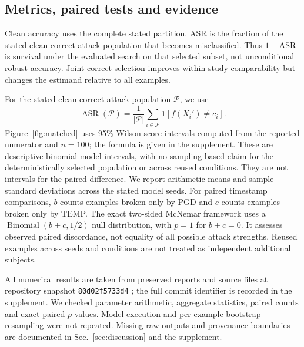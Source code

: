 \subsection{Metrics, paired tests and evidence}
Clean accuracy uses the complete stated partition. ASR is the fraction of the stated clean-correct attack population that becomes misclassified. Thus $1-\mathrm{ASR}$ is survival under the evaluated search on that selected subset, not unconditional robust accuracy. Joint-correct selection improves within-study comparability but changes the estimand relative to all examples.

For the stated clean-correct attack population $\mathcal{P}$, we use
\begin{equation}\label{eq:asr}
\operatorname{ASR}(\mathcal{P})=
\frac{1}{|\mathcal{P}|}\sum_{i\in\mathcal{P}}\mathbf{1}\!\left[f(X_i')\neq c_i\right].
\end{equation}
Figure~\ref{fig:matched} uses 95\% Wilson score intervals \cite{wilson1927} computed from the reported numerator and $n=100$; the formula is given in the supplement. These are descriptive binomial-model intervals, with no sampling-based claim for the deterministically selected population or across reused conditions. They are not intervals for the paired difference. We report arithmetic means and sample standard deviations across the stated model seeds. For paired timestamp comparisons, $b$ counts examples broken only by PGD and $c$ counts examples broken only by TEMP. The exact two-sided McNemar framework \cite{mcnemar1947} uses a $\operatorname{Binomial}(b+c,1/2)$ null distribution, with $p=1$ for $b+c=0$. It assesses observed paired discordance, not equality of all possible attack strengths. Reused examples across seeds and conditions are not treated as independent additional subjects.

All numerical results are taken from preserved reports and source files at repository snapshot \texttt{80d02f5733d4} \cite{repository}; the full commit identifier is recorded in the supplement. We checked parameter arithmetic, aggregate statistics, paired counts and exact paired $p$-values. Model execution and per-example bootstrap resampling were not repeated. Missing raw outputs and provenance boundaries are documented in Sec.~\ref{sec:discussion} and the supplement.

